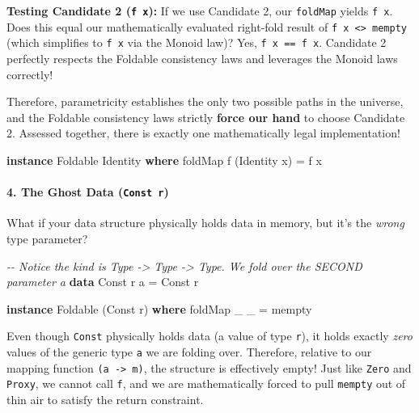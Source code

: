 \documentclass[
]{article}
\newenvironment{Shaded}{}{}
\newcommand{\CommentTok}[1]{\textcolor[rgb]{0.38,0.63,0.69}{\textit{#1}}}
\newcommand{\DataTypeTok}[1]{\textcolor[rgb]{0.56,0.13,0.00}{#1}}
\newcommand{\FunctionTok}[1]{\textcolor[rgb]{0.02,0.16,0.49}{#1}}
\newcommand{\KeywordTok}[1]{\textcolor[rgb]{0.00,0.44,0.13}{\textbf{#1}}}
\newcommand{\NormalTok}[1]{#1}
\newcommand{\OtherTok}[1]{\textcolor[rgb]{0.00,0.44,0.13}{#1}}
\begin{document}
\textbf{Testing Candidate 2 (\texttt{f\ x}):} If we use Candidate 2, our
\texttt{foldMap} yields \texttt{f\ x}. Does this equal our
mathematically evaluated right-fold result of
\texttt{f\ x\ \textless{}\textgreater{}\ mempty} (which simplifies to
\texttt{f\ x} via the Monoid law)? Yes, \texttt{f\ x\ ==\ f\ x}.
Candidate 2 perfectly respects the Foldable consistency laws and
leverages the Monoid laws correctly!

Therefore, parametricity establishes the only two possible paths in the
universe, and the Foldable consistency laws strictly \textbf{force our
hand} to choose Candidate 2. Assessed together, there is exactly one
mathematically legal implementation!

\begin{Shaded}
\begin{Highlighting}[]
\KeywordTok{instance} \DataTypeTok{Foldable} \DataTypeTok{Identity} \KeywordTok{where}
    \FunctionTok{foldMap}\NormalTok{ f (}\DataTypeTok{Identity}\NormalTok{ x) }\OtherTok{=}\NormalTok{ f x}
\end{Highlighting}
\end{Shaded}

\paragraph{\texorpdfstring{4. The Ghost Data
(\texttt{Const\ r})}{4. The Ghost Data (Const r)}}\label{the-ghost-data-const-r}

What if your data structure physically holds data in memory, but it's
the \emph{wrong} type parameter?

\begin{Shaded}
\begin{Highlighting}[]
\CommentTok{{-}{-} Notice the kind is \textasciigrave{}Type {-}\textgreater{} Type {-}\textgreater{} Type\textasciigrave{}. We fold over the SECOND parameter \textquotesingle{}a\textquotesingle{}}
\KeywordTok{data} \DataTypeTok{Const}\NormalTok{ r a }\OtherTok{=} \DataTypeTok{Const}\NormalTok{ r}

\KeywordTok{instance} \DataTypeTok{Foldable}\NormalTok{ (}\DataTypeTok{Const}\NormalTok{ r) }\KeywordTok{where}
    \FunctionTok{foldMap}\NormalTok{ \_ \_ }\OtherTok{=} \FunctionTok{mempty}
\end{Highlighting}
\end{Shaded}

Even though \texttt{Const} physically holds data (a value of type
\texttt{r}), it holds exactly \emph{zero} values of the generic type
\texttt{a} we are folding over. Therefore, relative to our mapping
function \texttt{(a\ -\textgreater{}\ m)}, the structure is effectively
empty! Just like \texttt{Zero} and \texttt{Proxy}, we cannot call
\texttt{f}, and we are mathematically forced to pull \texttt{mempty} out
of thin air to satisfy the return constraint.
\end{document}
